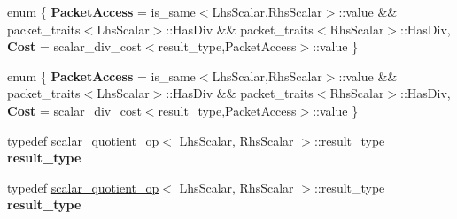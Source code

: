 \begin{DoxyCompactItemize}
\item 
\mbox{\label{struct_eigen_1_1internal_1_1functor__traits_3_01scalar__quotient__op_3_01_lhs_scalar_00_01_rhs_scalar_01_4_01_4_a1621ab3b1f344403b2b93cf3a12005ec}} 
enum \{ {\bfseries Packet\+Access} = is\+\_\+same$<$Lhs\+Scalar,Rhs\+Scalar$>$\+:\+:value \&\& packet\+\_\+traits$<$Lhs\+Scalar$>$\+:\+:Has\+Div \&\& packet\+\_\+traits$<$Rhs\+Scalar$>$\+:\+:Has\+Div, 
{\bfseries Cost} = scalar\+\_\+div\+\_\+cost$<$result\+\_\+type,Packet\+Access$>$\+:\+:value
 \}
\item 
\mbox{\label{struct_eigen_1_1internal_1_1functor__traits_3_01scalar__quotient__op_3_01_lhs_scalar_00_01_rhs_scalar_01_4_01_4_a1c5f77085617935f6ed2f0920942ab9d}} 
enum \{ {\bfseries Packet\+Access} = is\+\_\+same$<$Lhs\+Scalar,Rhs\+Scalar$>$\+:\+:value \&\& packet\+\_\+traits$<$Lhs\+Scalar$>$\+:\+:Has\+Div \&\& packet\+\_\+traits$<$Rhs\+Scalar$>$\+:\+:Has\+Div, 
{\bfseries Cost} = scalar\+\_\+div\+\_\+cost$<$result\+\_\+type,Packet\+Access$>$\+:\+:value
 \}
\item 
\mbox{\label{struct_eigen_1_1internal_1_1functor__traits_3_01scalar__quotient__op_3_01_lhs_scalar_00_01_rhs_scalar_01_4_01_4_a39bf7b81b9497502f4fff984dde9aa99}} 
typedef \hyperlink{struct_eigen_1_1internal_1_1scalar__quotient__op}{scalar\+\_\+quotient\+\_\+op}$<$ Lhs\+Scalar, Rhs\+Scalar $>$\+::result\+\_\+type {\bfseries result\+\_\+type}
\item 
\mbox{\label{struct_eigen_1_1internal_1_1functor__traits_3_01scalar__quotient__op_3_01_lhs_scalar_00_01_rhs_scalar_01_4_01_4_a39bf7b81b9497502f4fff984dde9aa99}} 
typedef \hyperlink{struct_eigen_1_1internal_1_1scalar__quotient__op}{scalar\+\_\+quotient\+\_\+op}$<$ Lhs\+Scalar, Rhs\+Scalar $>$\+::result\+\_\+type {\bfseries result\+\_\+type}
\end{DoxyCompactItemize}


